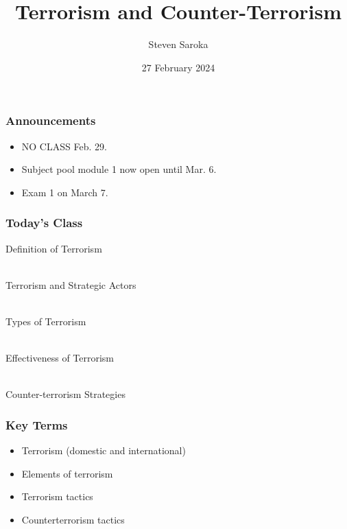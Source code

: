 \documentclass{beamer}
\title[Terrorism]{\LARGE{Terrorism and Counter-Terrorism}}
\author[POLI 150]{Steven Saroka}
\institute{POLI 150}
\date{27 February 2024}
\begin{document}
\begin{frame}
\titlepage %
\end{frame}




	\begin{frame} 
	\frametitle{\LARGE{Announcements}}
	\begin{itemize}
		\item NO CLASS Feb. 29.
		\item Subject pool module 1 now open until Mar. 6. 
		\item Exam 1 on March 7.
		
	\end{itemize}
\end{frame}

\begin{frame} 
\frametitle{\LARGE{Today's Class}}
	\begin{itemize}
		\Large{
			\item Definition of Terrorism
			\\~\\ 
			\item Terrorism and Strategic Actors
			\\~\\
			\item Types of Terrorism
			\\~\\
			\item Effectiveness of Terrorism
			\\~\\
			\item Counter-terrorism Strategies
		}
	\end{itemize}
\end{frame}

\begin{frame} 
	\frametitle{\LARGE{Key Terms}}
	\begin{itemize}
		\item Terrorism (domestic and international)
		\item Elements of terrorism
		\item Terrorism tactics
		\item Counterterrorism tactics
	\end{itemize}
\end{frame}
\end{document}
